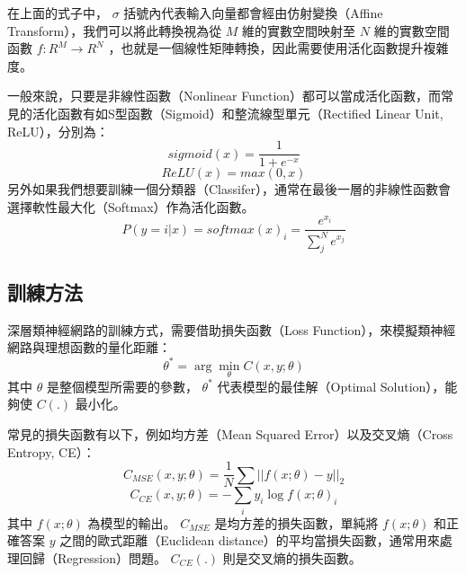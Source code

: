 在上面的式子中， $\sigma$ 括號內代表輸入向量都會經由仿射變換（Affine Transform），我們可以將此轉換視為從 $M$ 維的實數空間映射至 $N$ 維的實數空間函數 $f:R^M \rightarrow R^N$ ，也就是一個線性矩陣轉換，因此需要使用活化函數提升複雜度。

一般來說，只要是非線性函數（Nonlinear Function）都可以當成活化函數，而常見的活化函數有如S型函數（Sigmoid）和整流線型單元（Rectified Linear Unit, ReLU），分別為：
\begin{equation}
    sigmoid(x) = \frac{1}{1 + e^{-x}}
\end{equation}
\begin{equation}
    ReLU(x) = max(0,x)
\end{equation}
另外如果我們想要訓練一個分類器（Classifer），通常在最後一層的非線性函數會選擇軟性最大化（Softmax）作為活化函數。
\begin{equation}
    P(y = i|x)= softmax(x)_{i} = \frac{e^{x_i}}{\sum_j^N e^{x_j}}
\end{equation}

\subsection{訓練方法}
深層類神經網路的訓練方式，需要借助損失函數（Loss Function），來模擬類神經網路與理想函數的量化距離：
\begin{equation}
    \theta^{\ast} = \arg\min_{\theta}{C(x,y;\theta)}
\end{equation}
其中 $\theta$ 是整個模型所需要的參數， $\theta^{\ast}$ 代表模型的最佳解（Optimal Solution），能夠使 $C(.)$ 最小化。

常見的損失函數有以下，例如均方差（Mean Squared Error）以及交叉熵（Cross Entropy, CE）：
\begin{equation}
    C_{MSE}(x,y;\theta) = \frac{1}{N}\sum||f(x;\theta) - y||_{2}
\end{equation}
\begin{equation}
    C_{CE}(x,y;\theta) = -\sum_i y_i\log f(x;\theta)_i
\end{equation}
其中 $f(x;\theta)$ 為模型的輸出。 $C_{MSE}$ 是均方差的損失函數，單純將 $f(x;\theta)$ 和正確答案 $y$ 之間的歐式距離（Euclidean distance）的平均當損失函數，通常用來處理回歸（Regression）問題。 $C_{CE}(.)$ 則是交叉熵的損失函數。

